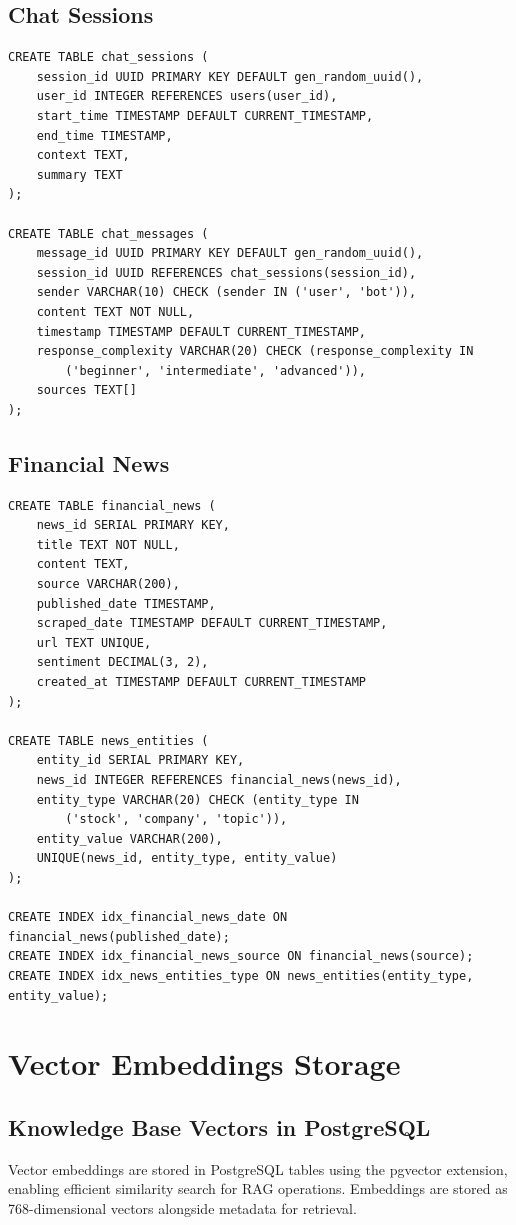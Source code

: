 \documentclass[12pt,a4paper]{report}
\begin{document}
\subsection{Chat Sessions}
\begin{lstlisting}
CREATE TABLE chat_sessions (
    session_id UUID PRIMARY KEY DEFAULT gen_random_uuid(),
    user_id INTEGER REFERENCES users(user_id),
    start_time TIMESTAMP DEFAULT CURRENT_TIMESTAMP,
    end_time TIMESTAMP,
    context TEXT,
    summary TEXT
);

CREATE TABLE chat_messages (
    message_id UUID PRIMARY KEY DEFAULT gen_random_uuid(),
    session_id UUID REFERENCES chat_sessions(session_id),
    sender VARCHAR(10) CHECK (sender IN ('user', 'bot')),
    content TEXT NOT NULL,
    timestamp TIMESTAMP DEFAULT CURRENT_TIMESTAMP,
    response_complexity VARCHAR(20) CHECK (response_complexity IN 
        ('beginner', 'intermediate', 'advanced')),
    sources TEXT[]
);
\end{lstlisting}

\subsection{Financial News}
\begin{lstlisting}
CREATE TABLE financial_news (
    news_id SERIAL PRIMARY KEY,
    title TEXT NOT NULL,
    content TEXT,
    source VARCHAR(200),
    published_date TIMESTAMP,
    scraped_date TIMESTAMP DEFAULT CURRENT_TIMESTAMP,
    url TEXT UNIQUE,
    sentiment DECIMAL(3, 2),
    created_at TIMESTAMP DEFAULT CURRENT_TIMESTAMP
);

CREATE TABLE news_entities (
    entity_id SERIAL PRIMARY KEY,
    news_id INTEGER REFERENCES financial_news(news_id),
    entity_type VARCHAR(20) CHECK (entity_type IN 
        ('stock', 'company', 'topic')),
    entity_value VARCHAR(200),
    UNIQUE(news_id, entity_type, entity_value)
);

CREATE INDEX idx_financial_news_date ON financial_news(published_date);
CREATE INDEX idx_financial_news_source ON financial_news(source);
CREATE INDEX idx_news_entities_type ON news_entities(entity_type, entity_value);
\end{lstlisting}

\section{Vector Embeddings Storage}

\subsection{Knowledge Base Vectors in PostgreSQL}
Vector embeddings are stored in PostgreSQL tables using the pgvector extension, enabling efficient similarity search for RAG operations. Embeddings are stored as 768-dimensional vectors alongside metadata for retrieval.
\end{document}
